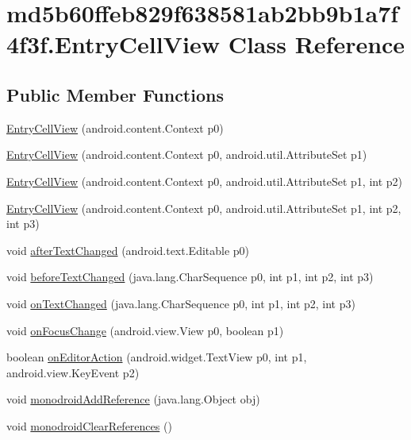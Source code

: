 \hypertarget{classmd5b60ffeb829f638581ab2bb9b1a7f4f3f_1_1_entry_cell_view}{
\section{md5b60ffeb829f638581ab2bb9b1a7f4f3f.EntryCellView Class Reference}
\label{classmd5b60ffeb829f638581ab2bb9b1a7f4f3f_1_1_entry_cell_view}
}
\subsection*{Public Member Functions}
\begin{CompactItemize}
\item 
\hyperlink{classmd5b60ffeb829f638581ab2bb9b1a7f4f3f_1_1_entry_cell_view_dbbaf6527f6daa54b8c17455243a5806}{EntryCellView} (android.content.Context p0)
\item 
\hyperlink{classmd5b60ffeb829f638581ab2bb9b1a7f4f3f_1_1_entry_cell_view_34f28cd0cc7b56ce0ac2064e7138170b}{EntryCellView} (android.content.Context p0, android.util.AttributeSet p1)
\item 
\hyperlink{classmd5b60ffeb829f638581ab2bb9b1a7f4f3f_1_1_entry_cell_view_2b0135e0b61be293bb38a6ac7d2c9b3f}{EntryCellView} (android.content.Context p0, android.util.AttributeSet p1, int p2)
\item 
\hyperlink{classmd5b60ffeb829f638581ab2bb9b1a7f4f3f_1_1_entry_cell_view_14a969f0bee94c6d0e466e8556927658}{EntryCellView} (android.content.Context p0, android.util.AttributeSet p1, int p2, int p3)
\item 
void \hyperlink{classmd5b60ffeb829f638581ab2bb9b1a7f4f3f_1_1_entry_cell_view_62f9d563c0b08b8bd5ca59c1794f5ed0}{afterTextChanged} (android.text.Editable p0)
\item 
void \hyperlink{classmd5b60ffeb829f638581ab2bb9b1a7f4f3f_1_1_entry_cell_view_cfae287696d61b422c2c4a85025777da}{beforeTextChanged} (java.lang.CharSequence p0, int p1, int p2, int p3)
\item 
void \hyperlink{classmd5b60ffeb829f638581ab2bb9b1a7f4f3f_1_1_entry_cell_view_330adc10508be12c9c6ce3d433f4d2cf}{onTextChanged} (java.lang.CharSequence p0, int p1, int p2, int p3)
\item 
void \hyperlink{classmd5b60ffeb829f638581ab2bb9b1a7f4f3f_1_1_entry_cell_view_6c445e9cfc29651b0b8e0809663ab5b8}{onFocusChange} (android.view.View p0, boolean p1)
\item 
boolean \hyperlink{classmd5b60ffeb829f638581ab2bb9b1a7f4f3f_1_1_entry_cell_view_32acde16da027f419d2b0456f5bc4ada}{onEditorAction} (android.widget.TextView p0, int p1, android.view.KeyEvent p2)
\item 
void \hyperlink{classmd5b60ffeb829f638581ab2bb9b1a7f4f3f_1_1_entry_cell_view_8aa0a5d92b90e3037d35cce81ecf8b6b}{monodroidAddReference} (java.lang.Object obj)
\item 
void \hyperlink{classmd5b60ffeb829f638581ab2bb9b1a7f4f3f_1_1_entry_cell_view_8bc0e236db435f7673b1350dca4cb844}{monodroidClearReferences} ()
\end{CompactItemize}
